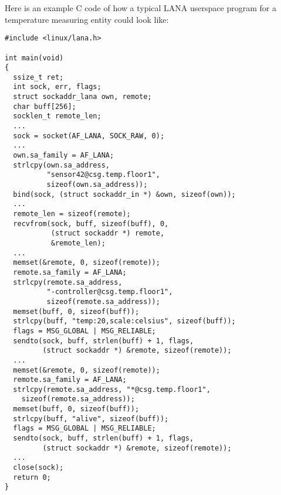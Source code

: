 \documentclass[times,10pt,twocolumn]{article}
\begin{document}
Here is an example C code of how a typical LANA userspace program 
for a temperature measuring entity could look like:\newline

\scriptsize{
\lstset{language=C}
\begin{lstlisting}
#include <linux/lana.h>

int main(void)
{
  ssize_t ret;
  int sock, err, flags;
  struct sockaddr_lana own, remote;
  char buff[256];
  socklen_t remote_len;
  ...
  sock = socket(AF_LANA, SOCK_RAW, 0);
  ...
  own.sa_family = AF_LANA;
  strlcpy(own.sa_address,
          "sensor42@csg.temp.floor1",
          sizeof(own.sa_address));
  bind(sock, (struct sockaddr_in *) &own, sizeof(own));
  ...
  remote_len = sizeof(remote);
  recvfrom(sock, buff, sizeof(buff), 0,
           (struct sockaddr *) remote,
           &remote_len);
  ...
  memset(&remote, 0, sizeof(remote));
  remote.sa_family = AF_LANA;
  strlcpy(remote.sa_address,
          "-controller@csg.temp.floor1",
          sizeof(remote.sa_address));
  memset(buff, 0, sizeof(buff));
  strlcpy(buff, "temp:20,scale:celsius", sizeof(buff));
  flags = MSG_GLOBAL | MSG_RELIABLE;
  sendto(sock, buff, strlen(buff) + 1, flags,
         (struct sockaddr *) &remote, sizeof(remote));
  ...
  memset(&remote, 0, sizeof(remote));
  remote.sa_family = AF_LANA;
  strlcpy(remote.sa_address, "*@csg.temp.floor1",
  	sizeof(remote.sa_address));
  memset(buff, 0, sizeof(buff));
  strlcpy(buff, "alive", sizeof(buff));
  flags = MSG_GLOBAL | MSG_RELIABLE;
  sendto(sock, buff, strlen(buff) + 1, flags,
         (struct sockaddr *) &remote, sizeof(remote));
  ...
  close(sock);
  return 0;
}
\end{lstlisting}
}
\normalsize


\nocite{*}


\end{document}
